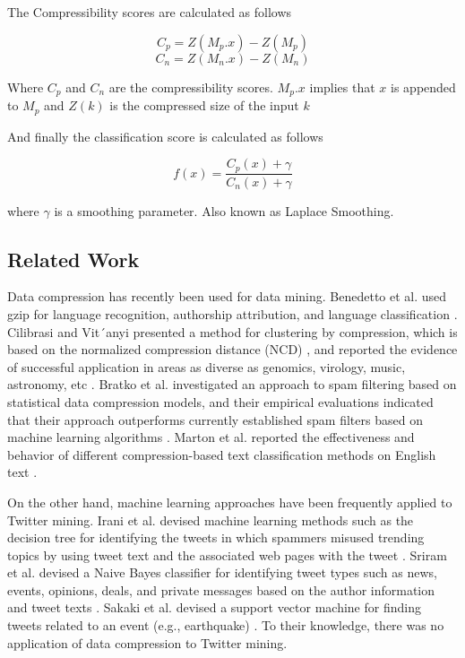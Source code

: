 \documentclass{article}
\begin{document}
The Compressibility scores are calculated as follows  \cite{10.1145/2064448.2064473}

$$C_p = Z(M_p . x) - Z(M_p)$$
$$C_n = Z(M_n . x) - Z(M_n)$$

Where $C_p$ and $C_n$ are the compressibility scores. $M_p . x$ implies that $x$ is appended to $M_p$ and $Z(k)$ is the compressed size of the input $k$ 

And finally the classification score is calculated as follows

$$
f(x) = \frac{C_p(x) + \gamma}{C_n(x) + \gamma}
$$

where $\gamma$ is a smoothing parameter. Also known as Laplace Smoothing. 

\subsection{Related Work}
Data compression has recently been used for data mining. Benedetto et al. used gzip for language recognition, authorship attribution, and language classification \cite{benedetto2002language}. Cilibrasi and Vit´anyi presented a method for clustering by compression, which is based on the normalized compression distance
(NCD) \cite{li2004similarity}, and reported the evidence of successful application in areas as diverse as genomics, virology, music, astronomy, etc \cite{cilibrasi2005clustering}. Bratko et al. investigated an approach to
spam filtering based on statistical data compression models, and their empirical evaluations indicated that their approach outperforms currently established spam filters based on machine learning algorithms \cite{bratko2006spam}. Marton et al. reported the effectiveness and behavior of different compression-based text classification methods on English text \cite{marton2005compression}.

On the other hand, machine learning approaches have been frequently applied to Twitter mining. Irani et al. devised machine learning methods such as the decision tree for identifying the tweets in which spammers misused
trending topics by using tweet text and the associated web
pages with the tweet \cite{irani2010study}. Sriram et al. devised a Naive Bayes
classifier for identifying tweet types such as news, events, opinions, deals, and private messages based on the author information and tweet texts \cite{sriram2010short}. Sakaki et al. devised a support vector machine for finding tweets related to an event (e.g., earthquake) \cite{sakaki2010earthquake}. To their knowledge, there was no application of data compression to Twitter mining.
\end{document}
